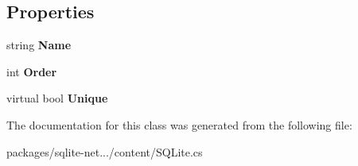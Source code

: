 \subsection*{Properties}
\begin{DoxyCompactItemize}
\item 
\hypertarget{classSQLite_1_1IndexedAttribute_af28bb1f4cb0440afac34d1759df70141}{string {\bfseries Name}}\label{classSQLite_1_1IndexedAttribute_af28bb1f4cb0440afac34d1759df70141}

\item 
\hypertarget{classSQLite_1_1IndexedAttribute_a5bd576cab9a58a3e296e3c02b8016a5c}{int {\bfseries Order}}\label{classSQLite_1_1IndexedAttribute_a5bd576cab9a58a3e296e3c02b8016a5c}

\item 
\hypertarget{classSQLite_1_1IndexedAttribute_abfa6500f25f0b1c9c6cb425f521eb781}{virtual bool {\bfseries Unique}}\label{classSQLite_1_1IndexedAttribute_abfa6500f25f0b1c9c6cb425f521eb781}

\end{DoxyCompactItemize}


The documentation for this class was generated from the following file\-:\begin{DoxyCompactItemize}
\item 
packages/sqlite-\/net.../content/S\-Q\-Lite.\-cs\end{DoxyCompactItemize}
